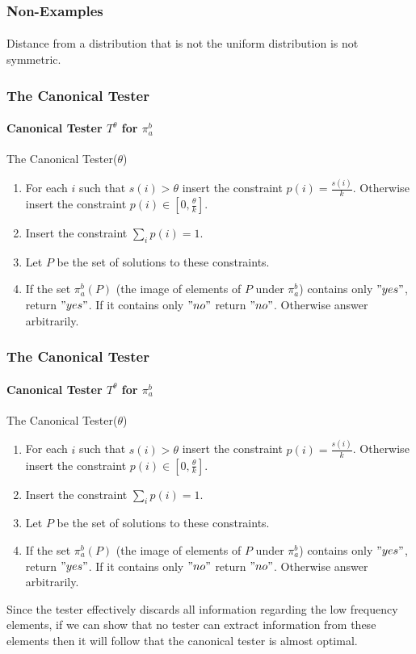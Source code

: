 \documentclass{beamer}
\begin{document}
\begin{frame}
  \frametitle{Non-Examples} \framesubtitle{}
  \begin{block}{}
    Distance from a distribution that is not the uniform distribution
    is not symmetric.
  \end{block}
\end{frame}


\begin{frame}
  \frametitle{The Canonical Tester} \framesubtitle{Canonical Tester
    $T^\theta$ for $\pi_a^b$}
  \begin{block}{The Canonical Tester($\theta$)}
    \begin{enumerate}
    \item<1-> For each $i$ such that $s(i)>\theta$ insert the constraint
      $p(i)=\frac{s(i)}{k}$. Otherwise insert the constraint $p(i)\in
      [0,\frac{\theta}{k}]$.
    \item<2-> Insert the constraint $\sum_ip(i)=1$.
    \item<3-> Let $P$ be the set of solutions to these constraints.
    \item<4-> If the set $\pi_a^b(P)$ (the image of elements of $P$ under
      $\pi_a^b$) contains only $"yes"$, return $"yes"$. If it contains
      only $"no"$ return $"no"$. Otherwise answer arbitrarily.
    \end{enumerate}
  \end{block}
\end{frame}
\begin{frame}
  \frametitle{The Canonical Tester} \framesubtitle{Canonical Tester
    $T^\theta$ for $\pi_a^b$}
  \begin{block}{The Canonical Tester($\theta$)}
    \begin{enumerate}
    \item For each $i$ such that $s(i)>\theta$ insert the constraint
      $p(i)=\frac{s(i)}{k}$. Otherwise insert the constraint $p(i)\in
      [0,\frac{\theta}{k}]$.
    \item Insert the constraint $\sum_ip(i)=1$.
    \item Let $P$ be the set of solutions to these constraints.
    \item If the set $\pi_a^b(P)$ (the image of elements of $P$ under
      $\pi_a^b$) contains only $"yes"$, return $"yes"$. If it contains
      only $"no"$ return $"no"$. Otherwise answer arbitrarily.
    \end{enumerate}
  \end{block}
  Since the tester effectively discards all information regarding the
  low frequency elements, if we can show that no tester can extract
  information from these elements then it will follow that the
  canonical tester is almost optimal.
\end{frame}
\end{document}
